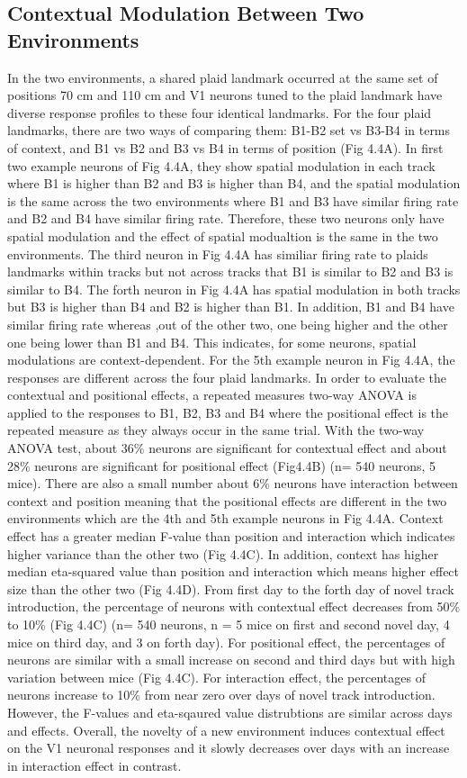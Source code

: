 \subsection{Contextual Modulation Between Two Environments}
In the two environments, a shared plaid landmark occurred at the same set of positions 70 cm and 110 cm and V1 neurons tuned to the plaid landmark have diverse response profiles to these four identical landmarks. For the four plaid landmarks, there are two ways of comparing them: B1-B2 set vs B3-B4 in terms of context, and B1 vs B2 and B3 vs B4 in terms of position (Fig 4.4A).  In first two example neurons of Fig 4.4A, they show spatial modulation in each track where B1 is higher than B2 and B3 is higher than B4, and the spatial modulation is the same across the two environments where B1 and B3 have similar firing rate and B2 and B4 have similar firing rate. Therefore, these two neurons only have spatial modulation and the effect of spatial modualtion is the same in the two environments. The third neuron in Fig 4.4A has similiar firing rate to plaids landmarks within tracks but not across tracks that B1 is similar to B2 and B3 is similar to B4. The forth neuron in Fig 4.4A has spatial modulation in both tracks but B3 is higher than B4 and B2 is higher than B1. In addition, B1 and B4 have similar firing rate whereas ,out of the other two, one being higher and the other one being lower than B1 and B4. This indicates, for some neurons, spatial modulations are context-dependent. For the 5th example neuron in Fig 4.4A, the responses are different across the four plaid landmarks. In order to evaluate the contextual and positional effects, a repeated measures two-way ANOVA is applied to the responses to B1, B2, B3 and B4 where the positional effect is the repeated measure as they always occur in the same trial. With the two-way ANOVA test, about 36\% neurons are significant for contextual effect and about 28\% neurons are significant for positional effect (Fig4.4B) (n= 540 neurons, 5 mice). There are also a small number about 6\% neurons have interaction between context and position meaning that the positional effects are different in the two environments which are the 4th and 5th example neurons in Fig 4.4A. Context effect has a greater median F-value than position and interaction which indicates higher variance than the other two (Fig 4.4C). In addition, context has higher median eta-squared value than position and interaction which means higher effect size than the other two (Fig 4.4D). From first day to the forth day of novel track introduction, the percentage of neurons with contextual effect decreases from 50\% to 10\% (Fig 4.4C) (n= 540 neurons, n = 5 mice on first and second novel day, 4 mice on third day, and 3 on forth day). For positional effect, the percentages of neurons are similar with a small increase on second and third days but with high variation between mice (Fig 4.4C). For interaction effect, the percentages of neurons increase to 10\% from near zero over days of novel track introduction. However, the F-values and eta-sqaured value distrubtions are similar across days and effects. Overall, the novelty of a new environment induces contextual effect on the V1 neuronal responses and it slowly decreases over days with an increase in interaction effect in contrast.
